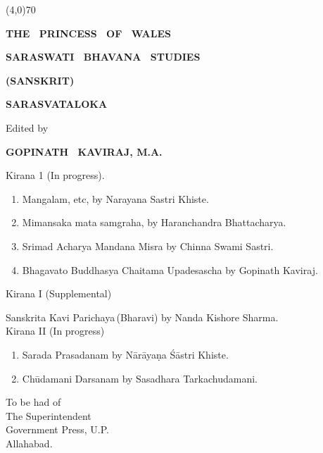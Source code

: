 \documentclass[11pt, openany]{book}
\begin{document}
\begin{center}
\line(4,0){70}
\end{center}

\newpage
\thispagestyle{empty}

\begin{center}
{\Large \textbf{THE ~PRINCESS ~OF ~WALES}}
\vspace{2mm}

{\Large \textbf{SARASWATI ~BHAVANA ~STUDIES}}
\vspace{2mm}

\textbf{(SANSKRIT)}
\vspace{2mm}

{\large \textbf{SARASVATALOKA}}
\vspace{2mm}

Edited by
\vspace{2mm}

\textbf{GOPINATH ~KAVIRAJ, M.A.}
\end{center}

\begin{sloppypar}
\noindent Kirana 1 (In progress).
\vspace{-2mm}

\begin{enumerate}[\indent(a)]
\setlength{\itemsep}{0pt}
\setlength{\parskip}{0pt}
\item Mangalam, etc, by Narayana Sastri Khiste.
\item Mimansaka mata samgraha, by Haranchandra Bhattacharya.
\item Srimad Acharya Mandana Misra by Chinna Swami Sastri.
\item Bhagavato Buddhasya Chaitama Upadesascha by Gopinath Kaviraj.
\end{enumerate}

\noindent Kirana I (Supplemental)\\
\vspace{-2mm}

Sanskrita Kavi Parichaya\textendash \,(Bharavi) by Nanda Kishore Sharma.\\

\noindent Kirana II (In progress)
\vspace{-2mm}

\begin{enumerate}[\indent(a)]
\setlength{\itemsep}{0pt}
\setlength{\parskip}{0pt}
\item Sarada Prasadanam by Nārāyaṇa Śāstri Khiste.
\item Chūdamani Darsanam by Sasadhara Tarkachudamani.
\end{enumerate}
\vspace{30mm}
\end{sloppypar}

\begin{flushright}
To be had of \hspace{8mm} ~ \\
The Superintendent \hspace{2mm} ~ \\
Government Press, U.P.\\
Allahabad. \hspace{7mm} ~ 
\end{flushright}
\end{document}
